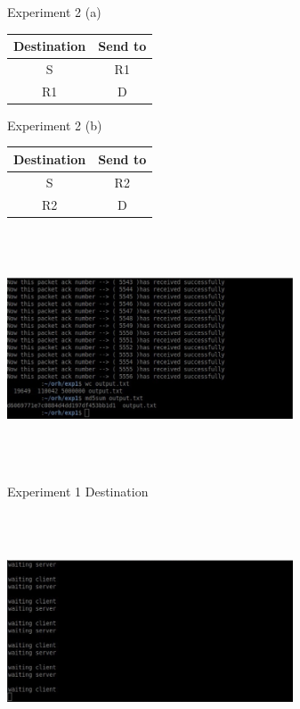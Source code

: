 \documentclass[letterpaper, 12 pt, conference]{ieeeconf}  %
\begin{document}
\vspace{6cm}
\begin{center}
Experiment 2 (a)
\end{center}

\begin{center}
 \begin{tabular}{||c c||} 
 \hline
 Destination & Send to  \\ [0.25ex] 
 \hline\hline
 S & R1  \\ 
 \hline
 R1 & D  \\
 
 \hline
\end{tabular}
\end{center}
\vspace{1cm}
\begin{center}
Experiment 2 (b)
\end{center}

\begin{center}
 \begin{tabular}{||c c||} 
 \hline
 Destination & Send to  \\ [0.25ex] 
 \hline\hline
 S & R2  \\ 
 \hline
 R2 & D  \\
 
 \hline
\end{tabular}
\end{center}


\includegraphics[width=8.5cm, height=7cm]{Experiment 1-dest.png}

\begin{center}
Experiment 1 Destination
\end{center}

\includegraphics[width=8.5cm, height=7cm]{Experiment 1-r3.png}
\end{document}
